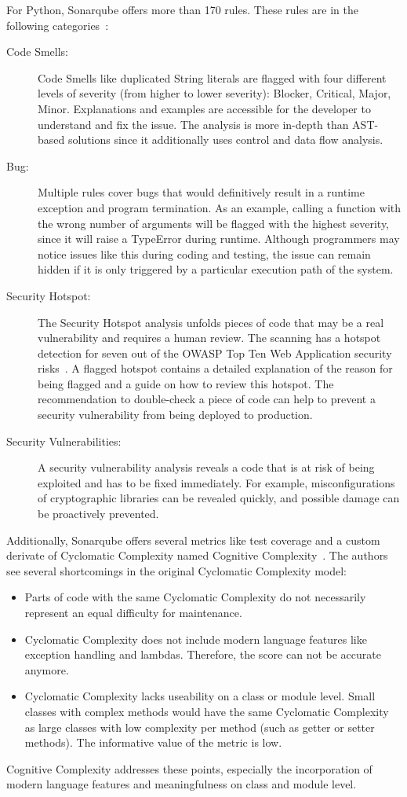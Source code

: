 For Python, Sonarqube offers more than 170 rules. These rules are in the following categories~\cite{noauthor_python_nodate}:
\begin{description}
    \item[Code Smells:] Code Smells like duplicated String literals are flagged with four different levels of severity (from higher to lower severity): Blocker, Critical, Major, Minor. Explanations and examples are accessible for the developer to understand and fix the issue. The analysis is more in-depth than AST-based solutions since it additionally uses control and data flow analysis.
    \item[Bug:] Multiple rules cover bugs that would definitively result in a runtime exception and program termination. As an example, calling a function with the wrong number of arguments will be flagged with the highest severity, since it will raise a TypeError during runtime. Although programmers may notice issues like this during coding and testing, the issue can remain hidden if it is only triggered by a particular execution path of the system.
     \item[Security Hotspot:] The Security Hotspot analysis unfolds pieces of code that may be a real vulnerability and requires a human review. The scanning has a hotspot detection for seven out of the OWASP Top Ten Web Application security risks~\cite{noauthor_python_nodate}. A flagged hotspot contains a detailed explanation of the reason for being flagged and a guide on how to review this hotspot. The recommendation to double-check a piece of code can help to prevent a security vulnerability from being deployed to production.
    \item[Security Vulnerabilities:]  A security vulnerability analysis reveals a code that is at risk of being exploited and has to be fixed immediately. For example, misconfigurations of cryptographic libraries can be revealed quickly, and possible damage can be proactively prevented.   
\end{description}

Additionally, Sonarqube offers several metrics like test coverage and a custom derivate of Cyclomatic Complexity named Cognitive Complexity~\cite{campbell2018cognitive}. The authors see several shortcomings in the original Cyclomatic Complexity model:
\begin{itemize}
    \item Parts of code with the same Cyclomatic Complexity do not necessarily represent an equal difficulty for maintenance.
    \item  Cyclomatic Complexity does not include modern language features like exception handling and lambdas. Therefore, the score can not be accurate anymore.
    \item Cyclomatic Complexity lacks useability on a class or module level. Small classes with complex methods would have the same Cyclomatic Complexity as large classes with low complexity per method (such as getter or setter methods). The informative value of the metric is low.
\end{itemize}
Cognitive Complexity addresses these points, especially the incorporation of modern language features and meaningfulness on class and module level.

